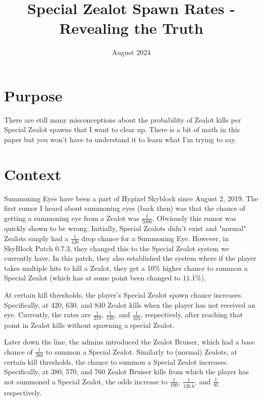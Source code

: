 \documentclass{article}
\title{Special Zealot Spawn Rates - Revealing the Truth}
\date{August 2024}
\begin{document}
\maketitle

\section{Purpose}

There are still many misconceptions about the probability of Zealot kills per Special Zealot spawns that I want to clear up. There is a bit of math in this paper but you won't have to understand it to learn what I'm trying to say.

\section{Context}

Summoning Eyes have been a part of Hypixel Skyblock since August 2, 2019. The first rumor I heard about summoning eyes (back then) was that the chance of getting a summoning eye from a Zealot was $\frac{1}{5000}$. Obviously this rumor was quickly shown to be wrong. Initially, Special Zealots didn't exist and "normal" Zealots simply had a $\frac{1}{420}$ drop chance for a Summoning Eye. However, in SkyBlock Patch 0.7.3, they changed this to the Special Zealot system we currently have. In this patch, they also established the system where if the player takes multiple hits to kill a Zealot, they get a 10\% higher chance to summon a Special Zealot (which has at some point been changed to $11.\overline{1}$\%).

\vspace{2mm}

At certain kill thresholds, the player's Special Zealot spawn chance increases. Specifically, at 420, 630, and 840 Zealot kills when the player has not received an eye. Currently, the rates are $\frac{1}{210}$, $\frac{1}{140}$, and $\frac{1}{105}$, respectively, after reaching that point in Zealot kills without spawning a special Zealot.

\vspace{2mm}

Later down the line, the admins introduced the Zealot Bruiser, which had a base chance of $\frac{1}{380}$ to summon a Special Zealot. Similarly to (normal) Zealots, at certain kill thresholds, the chance to summon a Special Zealot increases. Specifically, at 380, 570, and 760 Zealot Bruiser kills from which the player has not summoned a Special Zealot, the odds increase to $\frac{1}{190}$, $\frac{1}{126.\overline{6}}$, and $\frac{1}{95}$ respectively.
\end{document}
